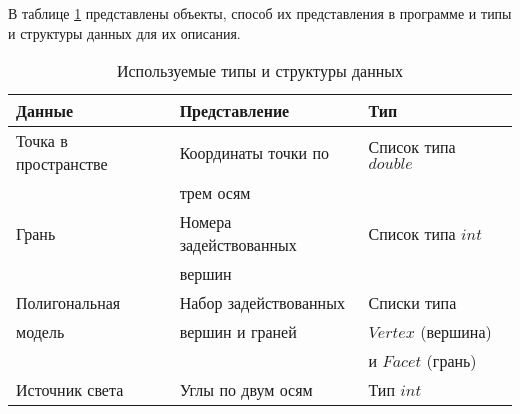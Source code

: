 В таблице \ref{tbl:types} представлены объекты, способ их представления в программе и типы и структуры данных для их описания.

\begin{table}[h]
\begin{center}
    \captionsetup{justification=raggedleft}
    \caption{\label{tbl:types}Используемые типы и структуры данных}
    \begin{tabular}{|l|l|l|}
        \hline
        Данные & Представление & Тип\\
        \hline
        Точка в пространстве & Координаты точки по & Список типа $double$ \\ 
                             & трем осям     &                      \\ 
        \hline
        Грань & Номера задействованных & Список типа $int$ \\ 
              & вершин                 &                   \\ 
        \hline
        Полигональная        & Набор задействованных & Списки типа \\ 
        модель               & вершин и граней       & $Vertex$ (вершина) \\
                             &                       & и $Facet$ (грань) \\ 

        \hline
        Источник света & Углы по двум осям & Тип $int$ \\ 
        \hline
    \end{tabular}
\end{center}
\end{table}

